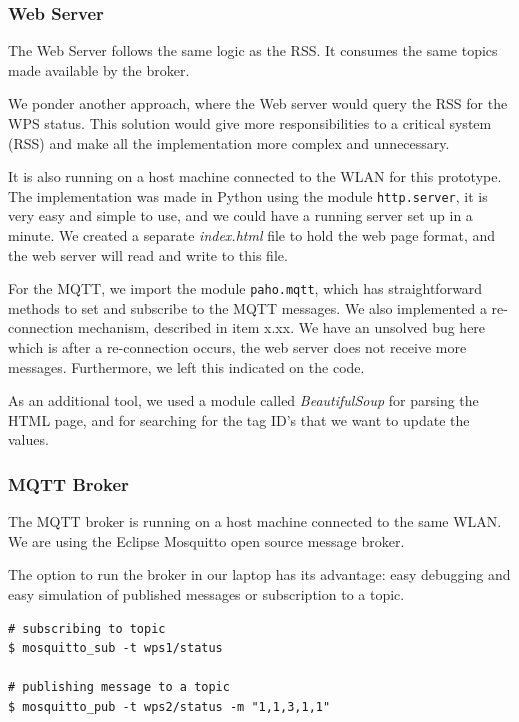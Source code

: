 \documentclass[11pt]{article}
\begin{document}
\subsubsection{Web Server}

The Web Server follows the same logic as the RSS. It consumes the same topics made available by the broker.

We ponder another approach, where the Web server would query the RSS for the WPS status. This solution would give more responsibilities to a critical system (RSS) and make all the implementation more complex and unnecessary.

It is also running on a host machine connected to the WLAN for this prototype.
The implementation was made in Python using the module \texttt{http.server}, it is very easy and simple to use, and we could have a running server set up in a minute.
We created a separate \textit{index.html} file to hold the web page format, and the web server will read and write to this file.

For the MQTT, we import the module \texttt{paho.mqtt}\cite{c3}, which has straightforward methods to set and subscribe to the MQTT messages. We also implemented a re-connection mechanism, described in item x.xx. We have an unsolved bug here which is after a re-connection occurs, the web server does not receive more messages. Furthermore, we left this indicated on the code.

As an additional tool, we used a module called \textit{BeautifulSoup} for parsing the HTML page, and for searching for the tag ID's that we want to update the values.

\subsubsection{MQTT Broker}

The MQTT broker is running on a host machine connected to the same WLAN. We are using the Eclipse Mosquitto open source message broker. 

The option to run the broker in our laptop has its advantage: easy debugging and easy simulation of published messages or subscription to a topic.

\begin{verbatim}
# subscribing to topic
$ mosquitto_sub -t wps1/status

# publishing message to a topic
$ mosquitto_pub -t wps2/status -m "1,1,3,1,1"
\end{verbatim}
\end{document}
